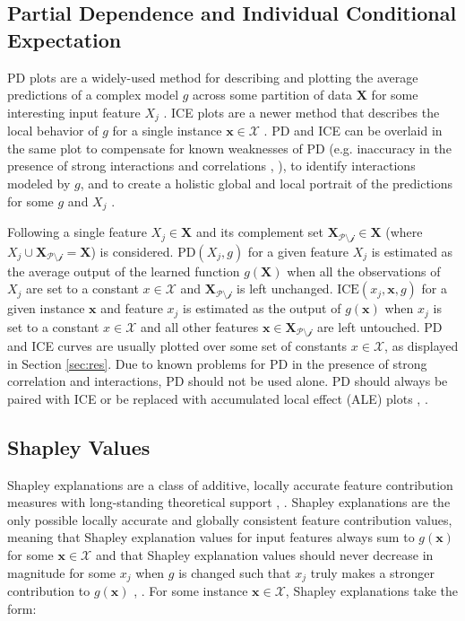 \documentclass[information,article,submit,moreauthors,pdftex]{definitions/mdpi}
\begin{document}
\subsection{Partial Dependence and Individual Conditional Expectation}\label{ssec:pd_ice}

PD plots are a widely-used method for describing and plotting the average predictions of a complex model $g$ across some partition of data $\mathbf{X}$ for some interesting input feature $X_j$ \cite{esl}. ICE plots are a newer method that describes the local behavior of $g$ for a single instance $\mathbf{x} \in \mathcal{X}$ \cite{ice_plots}. PD and ICE can be overlaid in the same plot to compensate for known weaknesses of PD (e.g. inaccuracy in the presence of strong interactions and correlations \cite{ice_plots}, \cite{ale_plot}), to identify interactions modeled by $g$, and to create a holistic global and local portrait of the predictions for some $g$ and $X_j$ \cite{ice_plots}.

Following \citet{esl} a single feature $X_j \in \mathbf{X}$ and its complement set $\mathbf{X}_{\mathcal{P\setminus{j}}} \in \mathbf{X}$ (where $X_j \cup \mathbf{X}_{\mathcal{P\setminus{j}}} = \mathbf{X}$) is considered. $\text{PD}(X_j, g)$ for a given feature $X_j$ is estimated as the average output of the learned function $g(\mathbf{X})$ when all the observations of $X_j$ are set to a constant $x \in \mathcal{X}$ and $\mathbf{X}_{\mathcal{P\setminus{j}}}$ is left unchanged. $\text{ICE}(x_j, \mathbf{x}, g)$ for a given instance $\mathbf{x}$ and feature $x_j$ is estimated as the output of $g(\mathbf{x})$ when $x_j$ is set to a constant $x \in \mathcal{X}$ and all other features $\mathbf{x} \in \mathbf{X}_{\mathcal{P\setminus{j}}}$ are left untouched. PD and ICE curves are usually plotted over some set of constants $x \in \mathcal{X}$, as displayed in Section \ref{sec:res}. Due to known problems for PD in the presence of strong correlation and interactions, PD should not be used alone. PD should always be paired with ICE or be replaced with accumulated local effect (ALE) plots \cite{ice_plots}, \cite{ale_plot}.

\subsection{Shapley Values}\label{ssec:shap}

Shapley explanations are a class of additive, locally accurate feature contribution measures with long-standing theoretical support \cite{shapley}, \cite{shapley1988shapley}. Shapley explanations are the only possible locally accurate and globally consistent feature contribution values, meaning that Shapley explanation values for input features always sum to $g(\mathbf{x})$ for some $\mathbf{x} \in \mathcal{X}$ and that Shapley explanation values should never decrease in magnitude for some $x_j$ when $g$ is changed such that $x_j$ truly makes a stronger contribution to $g(\mathbf{x})$ \cite{shapley}, \cite{tree_shap}. For some instance $\mathbf{x} \in \mathcal{X}$, Shapley explanations take the form: 
\end{document}
